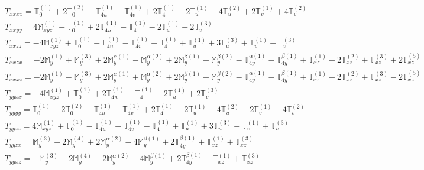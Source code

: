 \documentclass[fleqn,8pt,landscape]{jsarticle}
\begin{document}
\begin{align*}
& T_{xxxx} = \mathbb{T}_{0}^{(1)} + 2 \mathbb{T}_{0}^{(2)} - \mathbb{T}_{4u}^{(1)} + \mathbb{T}_{4v}^{(1)} + 2 \mathbb{T}_{4}^{(1)} - 2 \mathbb{T}_{u}^{(1)} - 4 \mathbb{T}_{u}^{(2)} + 2 \mathbb{T}_{v}^{(1)} + 4 \mathbb{T}_{v}^{(2)} \\
& T_{xxyy} = 4 \mathbb{M}_{xyz}^{(1)} + \mathbb{T}_{0}^{(1)} + 2 \mathbb{T}_{4u}^{(1)} - \mathbb{T}_{4}^{(1)} - 2 \mathbb{T}_{u}^{(1)} - 2 \mathbb{T}_{v}^{(3)} \\
& T_{xxzz} = - 4 \mathbb{M}_{xyz}^{(1)} + \mathbb{T}_{0}^{(1)} - \mathbb{T}_{4u}^{(1)} - \mathbb{T}_{4v}^{(1)} - \mathbb{T}_{4}^{(1)} + \mathbb{T}_{u}^{(1)} + 3 \mathbb{T}_{u}^{(3)} + \mathbb{T}_{v}^{(1)} - \mathbb{T}_{v}^{(3)} \\
& T_{xxzx} = - 2 \mathbb{M}_{y}^{(1)} + \mathbb{M}_{y}^{(3)} + 2 \mathbb{M}_{y}^{\alpha(1)} - \mathbb{M}_{y}^{\alpha(2)} + 2 \mathbb{M}_{y}^{\beta(1)} - \mathbb{M}_{y}^{\beta(2)} - \mathbb{T}_{4y}^{\alpha(1)} - \mathbb{T}_{4y}^{\beta(1)} + \mathbb{T}_{xz}^{(1)} + 2 \mathbb{T}_{xz}^{(2)} + \mathbb{T}_{xz}^{(3)} + 2 \mathbb{T}_{xz}^{(5)} \\
& T_{xxxz} = - 2 \mathbb{M}_{y}^{(1)} - \mathbb{M}_{y}^{(3)} + 2 \mathbb{M}_{y}^{\alpha(1)} + \mathbb{M}_{y}^{\alpha(2)} + 2 \mathbb{M}_{y}^{\beta(1)} + \mathbb{M}_{y}^{\beta(2)} - \mathbb{T}_{4y}^{\alpha(1)} - \mathbb{T}_{4y}^{\beta(1)} + \mathbb{T}_{xz}^{(1)} + 2 \mathbb{T}_{xz}^{(2)} + \mathbb{T}_{xz}^{(3)} - 2 \mathbb{T}_{xz}^{(5)} \\
& T_{yyxx} = - 4 \mathbb{M}_{xyz}^{(1)} + \mathbb{T}_{0}^{(1)} + 2 \mathbb{T}_{4u}^{(1)} - \mathbb{T}_{4}^{(1)} - 2 \mathbb{T}_{u}^{(1)} + 2 \mathbb{T}_{v}^{(3)} \\
& T_{yyyy} = \mathbb{T}_{0}^{(1)} + 2 \mathbb{T}_{0}^{(2)} - \mathbb{T}_{4u}^{(1)} - \mathbb{T}_{4v}^{(1)} + 2 \mathbb{T}_{4}^{(1)} - 2 \mathbb{T}_{u}^{(1)} - 4 \mathbb{T}_{u}^{(2)} - 2 \mathbb{T}_{v}^{(1)} - 4 \mathbb{T}_{v}^{(2)} \\
& T_{yyzz} = 4 \mathbb{M}_{xyz}^{(1)} + \mathbb{T}_{0}^{(1)} - \mathbb{T}_{4u}^{(1)} + \mathbb{T}_{4v}^{(1)} - \mathbb{T}_{4}^{(1)} + \mathbb{T}_{u}^{(1)} + 3 \mathbb{T}_{u}^{(3)} - \mathbb{T}_{v}^{(1)} + \mathbb{T}_{v}^{(3)} \\
& T_{yyzx} = \mathbb{M}_{y}^{(3)} + 2 \mathbb{M}_{y}^{(4)} + 2 \mathbb{M}_{y}^{\alpha(2)} - 4 \mathbb{M}_{y}^{\beta(1)} + 2 \mathbb{T}_{4y}^{\beta(1)} + \mathbb{T}_{xz}^{(1)} + \mathbb{T}_{xz}^{(3)} \\
& T_{yyxz} = - \mathbb{M}_{y}^{(3)} - 2 \mathbb{M}_{y}^{(4)} - 2 \mathbb{M}_{y}^{\alpha(2)} - 4 \mathbb{M}_{y}^{\beta(1)} + 2 \mathbb{T}_{4y}^{\beta(1)} + \mathbb{T}_{xz}^{(1)} + \mathbb{T}_{xz}^{(3)} \\

\end{align*}
\end{document}
